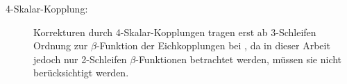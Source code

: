 \begin{description}
      
%       
%     
    
     \item[4-Skalar-Kopplung:]
    Korrekturen durch 
    4-Skalar-Kopplungen tragen erst ab 3-Schleifen Ordnung zur $\beta$-Funktion 
    der Eichkopplungen bei \cite{quartic_scalar}, da in dieser Arbeit jedoch 
    nur 2-Schleifen $\beta$-Funktionen betrachtet werden, müssen sie nicht 
    berücksichtigt werden.
  

\end{description}
